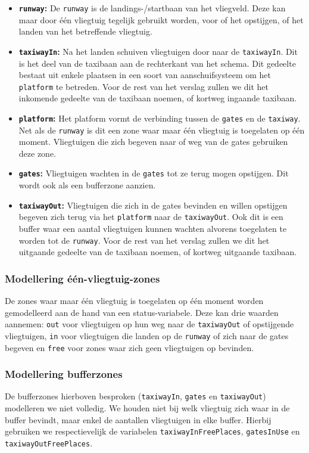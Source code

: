 \begin{itemize}
\item \textbf{\texttt{runway}:} De \texttt{runway} is de landings-/startbaan van het vliegveld. Deze kan maar door één vliegtuig tegelijk gebruikt worden, voor of het opstijgen, of het landen van het betreffende vliegtuig.
\item \textbf{\texttt{taxiwayIn}:} Na het landen schuiven vliegtuigen door naar de \texttt{taxiwayIn}. Dit is het deel van de taxibaan aan de rechterkant van het schema. Dit gedeelte bestaat uit enkele plaatsen in een soort van aanschuifsysteem om het \texttt{platform} te betreden. Voor de rest van het verslag zullen we dit het inkomende gedeelte van de taxibaan noemen, of kortweg ingaande taxibaan.
\item \textbf{\texttt{platform}:} Het platform vormt de verbinding tussen de \texttt{gates} en de \texttt{taxiway}. Net als de \texttt{runway} is dit een zone waar maar één vliegtuig is toegelaten op één moment. Vliegtuigen die zich begeven naar of weg van de gates gebruiken deze zone.
\item \textbf{\texttt{gates}:} Vliegtuigen wachten in de \texttt{gates} tot ze terug mogen opstijgen. Dit wordt ook als een bufferzone aanzien.
\item \textbf{\texttt{taxiwayOut}:} Vliegtuigen die zich in de gates bevinden en willen opstijgen begeven zich terug via het \texttt{platform} naar de \texttt{taxiwayOut}. Ook dit is een buffer waar een aantal vliegtuigen kunnen wachten alvorens toegelaten te worden tot de \texttt{runway}. Voor de rest van het verslag zullen we dit het uitgaande gedeelte van de taxibaan noemen, of kortweg uitgaande taxibaan.
\end{itemize}
 
\subsubsection{Modellering één-vliegtuig-zones}
\label{eenvliegtuigzones}
De zones waar maar één vliegtuig is toegelaten op één moment worden gemodelleerd aan de hand van een status-variabele. Deze kan drie waarden aannemen: \texttt{out} voor vliegtuigen op hun weg naar de \texttt{taxiwayOut} of opstijgende vliegtuigen, \texttt{in} voor vliegtuigen die landen op de \texttt{runway} of zich naar de gates begeven en \texttt{free} voor zones waar zich geen vliegtuigen op bevinden.
 
\subsubsection{Modellering bufferzones}
De bufferzones hierboven besproken (\texttt{taxiwayIn}, \texttt{gates} en \texttt{taxiwayOut}) modelleren we niet volledig. We houden niet bij welk vliegtuig zich waar in de buffer bevindt, maar enkel de aantallen vliegtuigen in elke buffer. Hierbij gebruiken we respectievelijk de variabelen \texttt{taxiwayInFreePlaces}, \texttt{gatesInUse} en \texttt{taxiwayOutFreePlaces}.

